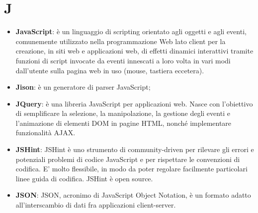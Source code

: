 \section{J}
\begin{itemize} 
	\item
	\textbf{JavaScript}: è un linguaggio di scripting orientato agli oggetti e agli eventi, comunemente utilizzato nella programmazione Web lato client per la creazione, in siti web e applicazioni web, di effetti dinamici interattivi tramite funzioni di script invocate da eventi innescati a loro volta in vari modi dall'utente sulla pagina web in uso (mouse, tastiera eccetera).
	\item
	\textbf{Jison}: è un generatore di parser JavaScript;
	\item
	\textbf{JQuery}: è una libreria JavaScript per applicazioni web. Nasce con l'obiettivo di semplificare la selezione, la manipolazione, la gestione degli eventi e l'animazione di elementi DOM in pagine HTML, nonché implementare funzionalità AJAX.
	\item
	\textbf{JSHint}: JSHint è uno strumento di community-driven per rilevare gli errori e potenziali problemi di codice JavaScript e per rispettare le convenzioni di codifica. E' molto flessibile, in modo da poter regolare facilmente particolari linee guida di codifica. JSHint è open source.
	\item
	\textbf{JSON}: JSON, acronimo di JavaScript Object Notation, è un formato adatto all'interscambio di dati fra applicazioni client-server.
\end{itemize}